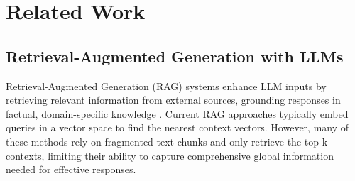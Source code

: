 \section{Related Work}
\label{sec:relate}

\vspace{-0.1in}
\subsection{Retrieval-Augmented Generation with LLMs}\vspace{-0.05in}
Retrieval-Augmented Generation (RAG) systems enhance LLM inputs by retrieving relevant information from external sources, grounding responses in factual, domain-specific knowledge \cite{ram2023context, fan2024survey}. Current RAG approaches \cite{hyde, gao2023retrieval, chan2024rq, yu2024rankrag} typically embed queries in a vector space to find the nearest context vectors. However, many of these methods rely on fragmented text chunks and only retrieve the top-k contexts, limiting their ability to capture comprehensive global information needed for effective responses.

